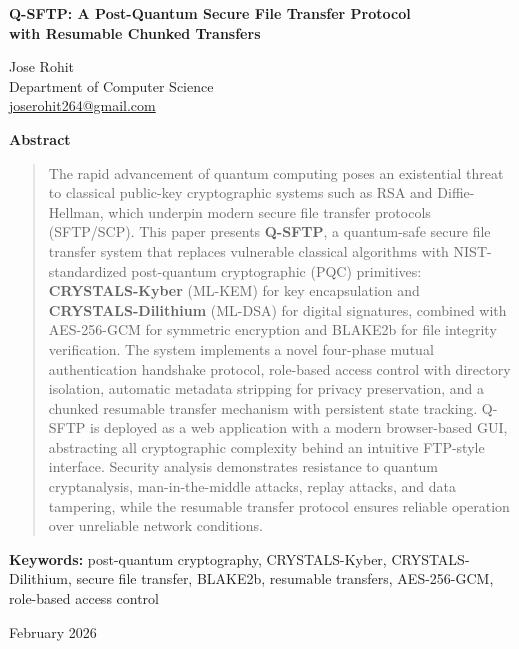 \documentclass[12pt, a4paper]{article}
\begin{document}
\begin{titlepage}
    \centering
    \vspace*{2cm}

    {\LARGE \textbf{Q-SFTP: A Post-Quantum Secure File Transfer Protocol\\[6pt]
    with Resumable Chunked Transfers}}

    \vspace{1.5cm}

    {\large Jose Rohit}\\[4pt]
    {\normalsize Department of Computer Science}\\[4pt]
    {\normalsize \href{mailto:joserohit264@gmail.com}{joserohit264@gmail.com}}

    \vspace{1.5cm}

    {\normalsize \textbf{Abstract}}

    \vspace{0.3cm}

    \begin{quote}
    \singlespacing
    \noindent The rapid advancement of quantum computing poses an existential threat to classical public-key cryptographic systems such as RSA and Diffie-Hellman, which underpin modern secure file transfer protocols (SFTP/SCP). This paper presents \textbf{Q-SFTP}, a quantum-safe secure file transfer system that replaces vulnerable classical algorithms with NIST-standardized post-quantum cryptographic (PQC) primitives: \textbf{CRYSTALS-Kyber} (ML-KEM) for key encapsulation and \textbf{CRYSTALS-Dilithium} (ML-DSA) for digital signatures, combined with AES-256-GCM for symmetric encryption and BLAKE2b for file integrity verification. The system implements a novel four-phase mutual authentication handshake protocol, role-based access control with directory isolation, automatic metadata stripping for privacy preservation, and a chunked resumable transfer mechanism with persistent state tracking. Q-SFTP is deployed as a web application with a modern browser-based GUI, abstracting all cryptographic complexity behind an intuitive FTP-style interface. Security analysis demonstrates resistance to quantum cryptanalysis, man-in-the-middle attacks, replay attacks, and data tampering, while the resumable transfer protocol ensures reliable operation over unreliable network conditions.
    \end{quote}

    \vspace{0.5cm}

    \noindent \textbf{Keywords:} post-quantum cryptography, CRYSTALS-Kyber, CRYSTALS-Dilithium, secure file transfer, BLAKE2b, resumable transfers, AES-256-GCM, role-based access control

    \vfill
    {\normalsize February 2026}
\end{titlepage}
\end{document}
